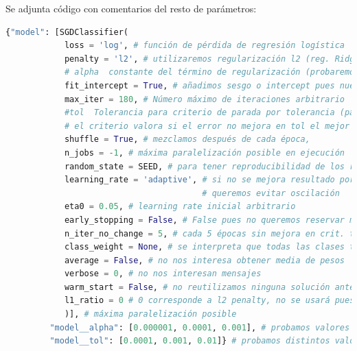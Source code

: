 \documentclass[11pt,a4paper]{article}
\theoremstyle{definition}
\begin{document}
	 Se adjunta código con comentarios del resto de parámetros:
	\begin{lstlisting}[language=Python, caption= Par\'ametros usados en SGDClassifier, inputencoding=latin1]
  {"model": [SGDClassifier(
            loss = 'log', # función de pérdida de regresión logística
            penalty = 'l2', # utilizaremos regularización l2 (reg. Ridge)
            # alpha  constante del término de regularización (probaremos distintos valores mediante 10-fold cross validation)
            fit_intercept = True, # añadimos sesgo o intercept pues nuestra matriz aún no tiene columna de 1s 
            max_iter = 180, # Número máximo de iteraciones arbitrario
            #tol  Tolerancia para criterio de parada por tolerancia (parar si loss > best_loss - tol tras n_iter_no_change épocas seguidas)
            # el criterio valora si el error no mejora en tol el mejor error hasta el momento. En nuestro caso esta condición por tolerancia se usará para learning_rate adaptativo
            shuffle = True, # mezclamos después de cada época,
            n_jobs = -1, # máxima paralelización posible en ejecución
            random_state = SEED, # para tener reproducibilidad de los resultados
            learning_rate = 'adaptive', # si no se mejora resultado por criterio tolerancia (loss > best_loss - tol) tras n_iter_no_change épocas seguidas, entonces cambiamos learning rate por (learning rate)/5
                                        # queremos evitar oscilación
            eta0 = 0.05, # learning rate inicial arbitrario
            early_stopping = False, # False pues no queremos reservar más datos para validación, consideramos nuestro dataset pequeño y que no conviene quitar más datos de training
            n_iter_no_change = 5, # cada 5 épocas sin mejora en crit. tolerancia se realizará la adaptación del learning rate (learning_rate='adaptive')
            class_weight = None, # se interpreta que todas las clases tienen peso 1, se elige así pues nuestro problema tiene clases balanceadas
            average = False, # no nos interesa obtener media de pesos
            verbose = 0, # no nos interesan mensajes 
            warm_start = False, # no reutilizamos ninguna solución anterior durante la validación cruzada
            l1_ratio = 0 # 0 corresponde a l2 penalty, no se usará pues solo se usa si learning_rate = 'elasticnet'
            )], # máxima paralelización posible
         "model__alpha": [0.000001, 0.0001, 0.001], # probamos valores de regularización (hiperparámetro)
         "model__tol": [0.0001, 0.001, 0.01]} # probamos distintos valores de tolerancia (hiperparámetro)

	\end{lstlisting}
	
\end{document}
